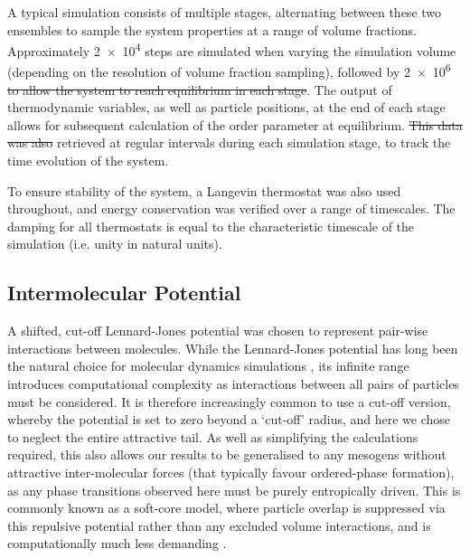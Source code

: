 \documentclass[11pt, a4paper]{article} %
\providecommand{\DIFadd}[1]{{\protect\color{blue}\uwave{#1}}} %
\providecommand{\DIFdel}[1]{{\protect\color{red}\sout{#1}}}                      %
\providecommand{\DIFaddbegin}{} %
\providecommand{\DIFaddend}{} %
\providecommand{\DIFdelbegin}{} %
\providecommand{\DIFdelend}{} %
\begin{document}
A typical simulation consists of multiple stages, alternating between these two ensembles to sample the system properties at a range of volume fractions. Approximately \num{2e4} steps are simulated when varying the simulation volume (depending on the resolution of volume fraction sampling), followed by \num{2e6} \DIFdelbegin \DIFdel{to allow the system to reach equilibrium in each stage}\DIFdelend \DIFaddbegin \DIFadd{\textcolor{forestgreen}{steps, allowing the system to reach equilibrium at each stage}}\DIFaddend . The output of thermodynamic variables, as well as particle positions, at the end of each stage allows for subsequent calculation of the order parameter at equilibrium. \DIFdelbegin \DIFdel{This data was also }\DIFdelend \DIFaddbegin \DIFadd{\textcolor{forestgreen}{These data were} }\DIFaddend retrieved at regular intervals during each simulation stage, to track the time evolution of the system.

To ensure stability of the system, a Langevin thermostat \cite{Schneider1978} was also used throughout, and energy conservation was verified over a range of timescales. The damping for all thermostats is equal to the characteristic timescale of the simulation (i.e. unity in natural units).



\subsection{Intermolecular Potential} \label{pair_potential}
A shifted, cut-off Lennard-Jones potential was chosen to represent pair-wise interactions between molecules. While the Lennard-Jones potential \cite{Jones1924a, Jones1924b} has long been the natural choice for molecular dynamics simulations \cite{Stephan2019}, its infinite range introduces computational complexity as interactions between all pairs of particles must be considered. It is therefore increasingly common to use a cut-off version, whereby the potential is set to zero beyond a `cut-off' radius, and here we chose to neglect the entire attractive tail. As well as simplifying the calculations required, this also allows our results to be generalised to any mesogens without attractive inter-molecular forces (that typically favour ordered-phase formation), as any phase transitions observed here must be purely entropically driven. This is commonly known as a soft-core model, where particle overlap is suppressed via this repulsive potential rather than any excluded volume interactions, and is computationally much less demanding \cite{Paolini1993, Hughes2008}.
\end{document}
